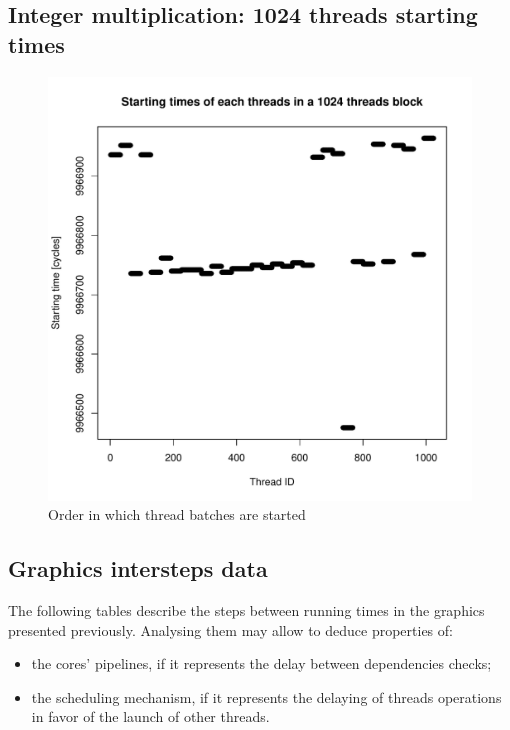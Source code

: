 \documentclass{article}
\def \scalingfactor{.8}
\begin{document}
	\subsection{Integer multiplication: 1024 threads starting times}
    \begin{figure}[h]
    		\centering
		\vspace{-20pt}
	    	\includegraphics[width=\scalingfactor\linewidth]{"graphics/starting_times_ratio31"}
	    	\vspace{-15pt}
	    	\caption{Order in which thread batches are started}
    \end{figure}

    \subsection{Graphics intersteps data}
    The following tables describe the steps between running times in the graphics presented previously. Analysing them may allow to deduce properties of: 
    \begin{itemize} 
        \item the cores' pipelines, if it represents the delay between dependencies checks;
        \item the scheduling mechanism, if it represents the delaying of threads operations in favor of the launch of other threads.
    \end{itemize}
    \centering
    
    
    \pagebreak
    
\end{document}
